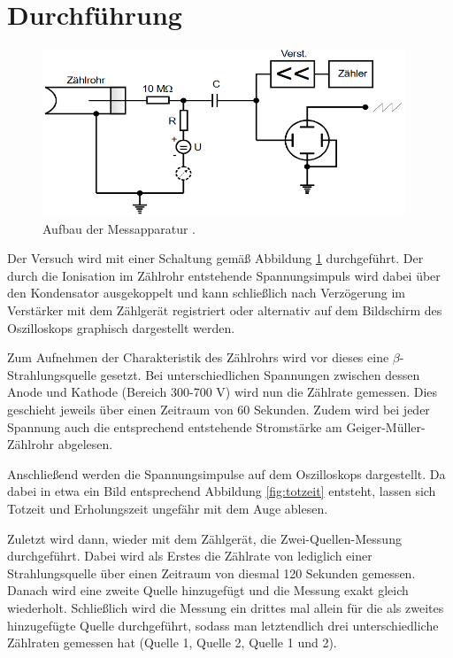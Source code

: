 \section{Durchführung}
\label{sec:Durchführung}

\begin{figure}[H]
  \centering
  \includegraphics[height=5cm]{Schaltung.PNG}
  \caption{Aufbau der Messapparatur \cite{sample}.}
  \label{fig:schaltung}
\end{figure}

Der Versuch wird mit einer Schaltung gemäß Abbildung \ref{fig:schaltung} durchgeführt.
Der durch die Ionisation im Zählrohr entstehende Spannungsimpuls wird dabei über den Kondensator
ausgekoppelt und kann schließlich nach Verzögerung im Verstärker mit dem Zählgerät registriert
oder alternativ auf dem Bildschirm des Oszilloskops graphisch dargestellt werden.

Zum Aufnehmen der Charakteristik des Zählrohrs wird vor dieses eine $\beta$-Strahlungsquelle gesetzt.
Bei unterschiedlichen Spannungen zwischen dessen Anode und Kathode (Bereich 300-700 V) wird nun die
Zählrate gemessen. Dies geschieht jeweils über einen Zeitraum von 60 Sekunden. Zudem wird bei jeder
Spannung auch die entsprechend entstehende Stromstärke am Geiger-Müller-Zählrohr abgelesen.

Anschließend werden die Spannungsimpulse auf dem Oszilloskops dargestellt. Da dabei in etwa ein
Bild entsprechend Abbildung \ref{fig:totzeit} entsteht, lassen sich Totzeit und Erholungszeit
ungefähr mit dem Auge ablesen.

Zuletzt wird dann, wieder mit dem Zählgerät, die Zwei-Quellen-Messung durchgeführt.
Dabei wird als Erstes die Zählrate von lediglich einer Strahlungsquelle über einen Zeitraum
von diesmal 120 Sekunden gemessen. Danach wird eine zweite Quelle hinzugefügt und die Messung
exakt gleich wiederholt. Schließlich wird die Messung ein drittes mal allein für die
als zweites hinzugefügte Quelle durchgeführt, sodass man letztendlich drei unterschiedliche
Zählraten gemessen hat (Quelle 1, Quelle 2, Quelle 1 und 2).
